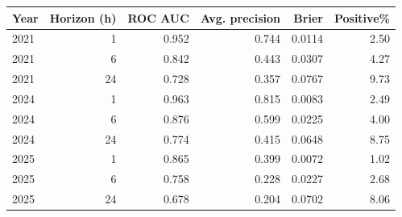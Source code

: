 \begin{tabular}{lrrrrr}
\toprule
Year & Horizon (h) & ROC AUC & Avg. precision & Brier & Positive\% \\
\midrule
2021 & 1 & 0.952 & 0.744 & 0.0114 & 2.50 \\
2021 & 6 & 0.842 & 0.443 & 0.0307 & 4.27 \\
2021 & 24 & 0.728 & 0.357 & 0.0767 & 9.73 \\
2024 & 1 & 0.963 & 0.815 & 0.0083 & 2.49 \\
2024 & 6 & 0.876 & 0.599 & 0.0225 & 4.00 \\
2024 & 24 & 0.774 & 0.415 & 0.0648 & 8.75 \\
2025 & 1 & 0.865 & 0.399 & 0.0072 & 1.02 \\
2025 & 6 & 0.758 & 0.228 & 0.0227 & 2.68 \\
2025 & 24 & 0.678 & 0.204 & 0.0702 & 8.06 \\
\bottomrule
\end{tabular}

